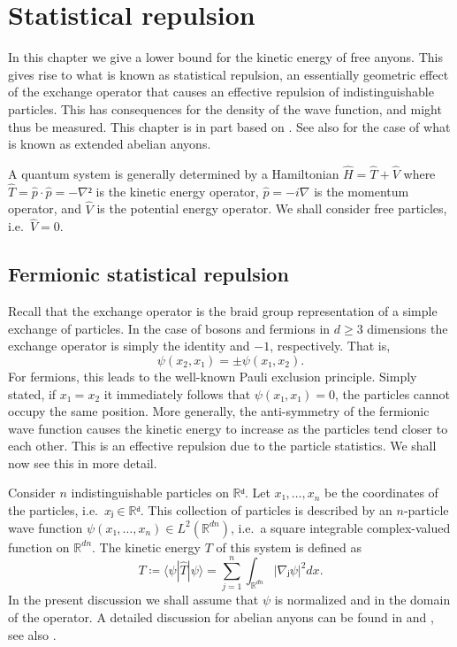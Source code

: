 
\chapter{Statistical repulsion}\label{chap:statistical repulsion}

In this chapter we give a lower bound for the kinetic energy of free anyons. This gives rise to what is known as statistical repulsion, an essentially geometric effect of the exchange operator that causes an effective repulsion of indistinguishable particles. This has consequences for the density of the wave function, and might thus be measured. This chapter is in part based on \cite{methmmp,lundholm-solovej,mancarella}. See also \cite{larson-lundholm} for the case of what is known as extended abelian anyons.


A quantum system is generally determined by a Hamiltonian $\hat{H} = \hat{T} + \hat{V}$ where $\hat{T} = \hat{p}⋅\hat{p} = -∇²$ is the kinetic energy operator, $\hat{p} = -i∇$ is the momentum operator, and $\hat{V}$ is the potential energy operator. We shall consider free particles, i.e.\ $\hat{V} = 0.$






\section{Fermionic statistical repulsion}

Recall that the exchange operator is the braid group representation of a simple exchange of particles. In the case of bosons and fermions in $d ≥ 3$ dimensions the exchange operator is simply the identity and $-1$, respectively. That is,
\begin{equation}
  ψ(x_2, x₁) = \pm ψ(x₁, x_2).
\end{equation}
For fermions, this leads to the well-known Pauli exclusion principle. Simply stated, if $x₁ = x_2$ it immediately follows that $ψ(x₁, x₁) = 0$, the particles cannot occupy the same position. More generally, the anti-symmetry of the fermionic wave function causes the kinetic energy to increase as the particles tend closer to each other. This is an effective repulsion due to the particle statistics. We shall now see this in more detail.

Consider $n$ indistinguishable particles on $ℝᵈ$. Let $x₁, …, x_n$ be the coordinates of the particles, i.e.\ $xⱼ ∈ ℝᵈ$. This collection of particles is described by an $n$-particle wave function $ψ(x₁, …, x_n) ∈ L^2(ℝ^{dn})$, i.e.\ a square integrable complex-valued function on $ℝ^{dn}$. The kinetic energy $T$ of this system is defined as
\begin{equation}
  T ≔ ⟨ψ|\hat{T}|ψ⟩ = ∑_{j=1}^n ∫_{ℝ^{dn}} |∇ⱼ ψ|^2 dx.
\end{equation}
In the present discussion we shall assume that $ψ$ is normalized and in the domain of the operator. A detailed discussion for abelian anyons can be found in \cite{larson-lundholm} and \cite{lundholm-solovejAHP}, see also \cite{dellantonio}.

